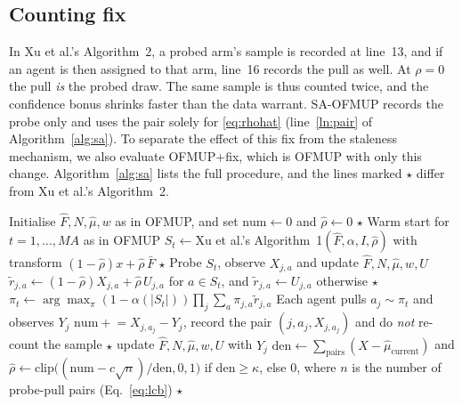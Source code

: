 \documentclass[letterpaper]{article}
\newcommand{\rhat}{\hat{\rho}}
\begin{document}
\subsection{Counting fix}
\label{sec:count}
In Xu et al.'s Algorithm~2, a probed arm's sample is recorded at line~13, and if
an agent is then assigned to that arm, line~16 records the pull as well. At
$\rho=0$ the pull \emph{is} the probed draw. The same sample is thus counted
twice, and the confidence bonus shrinks faster than the data warrant. SA-OFMUP
records the probe only and uses the pair solely for \eqref{eq:rhohat}
(line~\ref{ln:pair} of Algorithm~\ref{alg:sa}). To separate the effect of this
fix from the staleness mechanism, we also evaluate OFMUP+fix, which is OFMUP
with only this change. Algorithm~\ref{alg:sa} lists the full procedure, and the
lines marked $\star$ differ from Xu et al.'s Algorithm~2.

\setcounter{algorithm}{2}
\begin{algorithm}[t]
\caption{SA-OFMUP (changes to Xu et al.'s Algorithm~2 marked $\star$)}
\label{alg:sa}
\begin{algorithmic}[1]
\STATE Initialise $\hat F,N,\hat\mu,w$ as in OFMUP, and set $\mathrm{num}\leftarrow0$ and $\rhat\leftarrow0$ $\star$
\STATE Warm start for $t=1,\dots,MA$ as in OFMUP
  \STATE $S_t\leftarrow{}$Xu et al.'s Algorithm~1$(\hat F,\alpha,I,\rhat)$ with transform $(1-\rhat)x+\rhat\,\bar F$ $\star$ \label{ln:probe}
  \STATE Probe $S_t$, observe $X_{j,a}$ and update $\hat F,N,\hat\mu,w,U$
  \STATE $\tilde r_{j,a}\leftarrow(1-\rhat)X_{j,a}+\rhat\,U_{j,a}$ for $a\in S_t$, and $\tilde r_{j,a}\leftarrow U_{j,a}$ otherwise $\star$ \label{ln:assign}
  \STATE $\pi_t\leftarrow\arg\max_\pi(1-\alpha(|S_t|))\prod_j\sum_a\pi_{j,a}\tilde r_{j,a}$
  \STATE Each agent pulls $a_{j}\sim\pi_{t}$ and observes $Y_j$
      \STATE $\mathrm{num}\mathrel{+}=X_{j,a_j}-Y_j$, record the pair $(j,a_j,X_{j,a_j})$ and do \emph{not} re-count the sample $\star$ \label{ln:pair}
    \ELSE
      \STATE update $\hat F,N,\hat\mu,w,U$ with $Y_j$
    \ENDIF
  \ENDFOR
  \STATE $\mathrm{den}\leftarrow\sum_{\text{pairs}}(X-\hat\mu_{\text{current}})$ and $\rhat\leftarrow\mathrm{clip}\big((\mathrm{num}-c\sqrt{n})/\mathrm{den},0,1\big)$ if $\mathrm{den}\ge\kappa$, else $0$, where $n$ is the number of probe-pull pairs (Eq.~\ref{eq:lcb}) $\star$ \label{ln:rho}
\ENDFOR
\end{algorithmic}
\end{algorithm}
\end{document}
